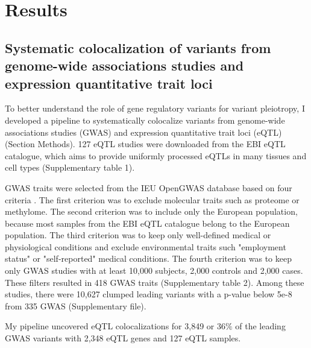 \section*{Results}\label{s:results}

\subsection*{Systematic colocalization of variants from genome-wide associations studies and expression quantitative trait loci}

To better understand the role of gene regulatory variants for variant pleiotropy,
I developed a pipeline to systematically colocalize variants from genome-wide associations
studies (GWAS) and expression quantitative trait loci (eQTL) (Section Methods).
%
127 eQTL studies were downloaded from the EBI eQTL catalogue, which aims to provide uniformly processed eQTLs in many
tissues and cell types \citep{2021.Alasoo.Kerimov} (Supplementary table 1).

GWAS traits were selected from the IEU OpenGWAS database based on four criteria \citep{2018.Parkinson.Buniello}.
%
The first criterion was to exclude molecular traits such as proteome or methylome.
%	
The second criterion was to include only the European population, because most
samples from the EBI eQTL catalogue belong to the European population.
%
The third criterion was to keep only well-defined medical or physiological
conditions and exclude environmental traits such "employment status" or "self-reported" medical conditions.
%
The fourth criterion was to keep only GWAS studies with at least 10,000 subjects, 2,000 controls and 2,000 cases.
%
These filters resulted in 418 GWAS traits (Supplementary table 2).
%
Among these studies, there were 10,627 clumped leading variants with a p-value below 5e-8 from 335 GWAS (Supplementary file).

My pipeline uncovered eQTL colocalizations for 3,849 or 36$\%$ of the leading GWAS variants with 2,348 eQTL genes and 127 eQTL samples.

